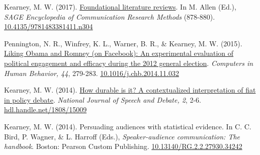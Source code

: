 \begin{bibenum}
\item[] Kearney, M. W. (2017).
\href{http://mikewk.com/flr.pdf}{Foundational literature reviews}.
In M. Allen (Ed.), \textit{SAGE Encyclopedia of Communication Research Methods} (878-880).
\href{http://dx.doi.org/10.4135/9781483381411.n304}{10.4135/9781483381411.n304}

\item Pennington, N. R., Winfrey, K. L., Warner, B. R., \& Kearney, M. W. (2015).
\href{http://www.researchgate.net/publication/269728178_Liking_Obama_and_Romney_(on_Facebook)_An_experimental_evaluation_of_political_engagement_and_efficacy_during_the_2012_general_election}{
  Liking Obama and Romney (on Facebook): An experimental evaluation of political engagement and efficacy during the 2012 general election}.
\textit{Computers in Human Behavior, 44}, 279-283.
\href{https://doi.org/10.1016/j.chb.2014.11.032}{10.1016/j.chb.2014.11.032}

\item Kearney, M. W. (2014). \href{http://ssrn.com/abstract=2618298}{
  How durable is it? A contextualized interpretation of fiat in policy debate}.
\textit{National Journal of Speech and Debate, 2}, 2-6.
\href{http://hdl.handle.net/1808/15009}{hdl.handle.net/1808/15009}

\item[] Kearney, M. W. (2014). Persuading audiences with statistical evidence.
In C. C. Bird, P. Wagner, \& L. Harroff (Eds.), \textit{Speaker-audience communication: The handbook}.
Boston: Pearson Custom Publishing.
\href{https://dx.doi.org/10.13140/RG.2.2.27930.34242}{10.13140/RG.2.2.27930.34242}
\end{bibenum}
